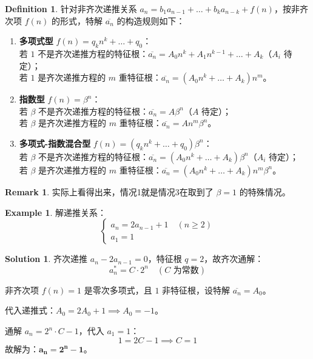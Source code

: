 \documentclass[oneside]{book}
\theoremstyle{definition}
\newtheorem{example}{Example}[section]
\newtheorem{definition}{Definition}[section]
\newtheorem{remark}{Remark}[section]
\newtheorem*{sol}{Solution}
\begin{document}
\begin{definition}
	针对非齐次递推关系 \( a_n = b_1 a_{n-1} + \dots + b_k a_{n-k} + f(n) \)，按非齐次项 \( f(n) \) 的形式，特解 \( \overline{a_n} \) 的构造规则如下：  
	
	\begin{enumerate}
		\item \textbf{多项式型} \( f(n) = q_k n^k + \dots + q_0 \)： \\		
		若 \( 1 \) 不是齐次递推方程的特征根：\( \overline{a_n} = A_0 n^k +A_1n^{k-1} +\dots + A_k \)（\( A_i \) 待定）；  \\
		若 \( 1 \) 是齐次递推方程的 \( m \) 重特征根：\( \overline{a_n} = (A_0 n^k + \dots + A_k) n^m \)。  
		
		\item \textbf{指数型} \( f(n) = \beta^n \)：  \\
		若 \( \beta \) 不是齐次递推方程的特征根：\( \overline{a_n} = A \beta^n \)（\( A \) 待定）； \\ 
		若 \( \beta \) 是齐次递推方程的 \( m \) 重特征根：\( \overline{a_n} = A n^m \beta^n \)。  
		
		\item \textbf{多项式-指数混合型} \( f(n) = (q_k n^k + \dots + q_0) \beta^n \)：  \\
		若 \( \beta \) 不是齐次递推方程的特征根：\( \overline{a_n} = (A_0 n^k + \dots + A_k) \beta^n \)（\( A_i \) 待定）； \\ 
		若 \( \beta \) 是齐次递推方程的 \( m \) 重特征根：\( \overline{a_n} = (A_0 n^k + \dots + A_k) n^m \beta^n \)。  
	\end{enumerate}  
\end{definition}  
\begin{remark}
	实际上看得出来，情况1就是情况3在取到了 \(\beta=1\) 的特殊情况。
\end{remark}

\begin{example}
	解递推关系：  
	\[
	\begin{cases} 
		a_n = 2a_{n-1} + 1 \quad (n \geq 2) \\ 
		a_1 = 1 
	\end{cases}
	\]  
\end{example}  
\begin{sol}
		齐次递推 \( a_n - 2a_{n-1} = 0 \)，特征根 \( q=2 \)，故齐次通解：  
	\[
	a_n^* = C \cdot 2^n \quad (C \text{ 为常数})
	\]  
	
	非齐次项 \( f(n)=1 \) 是零次多项式，且 \( 1 \) 非特征根，设特解 \( \overline{a_n} = A_0 \)。  
	 
	代入递推式：\( A_0 = 2A_0 + 1 \implies A_0 = -1 \)。  
	 
	通解 \( a_n = 2^n \cdot C - 1 \)，代入 \( a_1=1 \)：  
	\[
	1 = 2C - 1 \implies C=1
	\]  
	故解为：\( \boldsymbol{a_n = 2^n - 1} \)。  

\end{sol}
\end{document}
